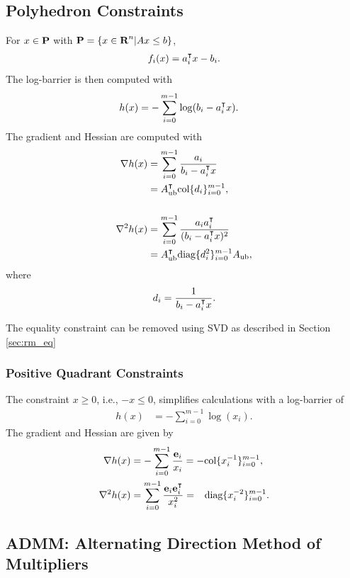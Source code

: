 \documentclass{article}
\begin{document}

\subsection{Polyhedron Constraints}
    For $x\in\textbf{P}$ with $\textbf{P}=\{x\in\textbf{R}^n|Ax\leq b\}$, 
    \begin{align*}
        f_i(x)=a_i^\intercal x-b_i.
    \end{align*}
    The log-barrier is then computed with
    \begin{align*}
        h(x)&=-\sum_{i=0}^{m-1} \log(b_i-a_i^\intercal x).
    \end{align*}
    The gradient and Hessian are computed with
    \begin{align*}
        \nabla h(x)&=\sum_{i=0}^{m-1} \frac{a_i}{b_i-a_i^\intercal x}
        \\&=A_{\text{ub}}^\intercal \text{col}\{d_i\}_{i=0}^{m-1},
        \\\\
        \nabla^2 h(x)&=\sum_{i=0}^{m-1} \frac{a_ia_i^\intercal}{(b_i-a_i^\intercal x)^2}
        \\&=A_{\text{ub}}^\intercal \text{diag}\{d_i^2\}_{i=0}^{m-1} A_{\text{ub}},
    \end{align*}
    where
    \begin{align*}
        d_i=\frac{1}{b_i-a_i^\intercal x}.
    \end{align*}

    The equality constraint can be removed using SVD as described in Section
    \ref{sec:rm_eq}

    \clearpage
\subsubsection{Positive Quadrant Constraints}
    The constraint $x\geq0$, i.e., $-x\leq0$, simplifies calculations with
    a log-barrier of 
    \begin{align*}
        h(x)&=-\sum_{i=0}^{m-1} \log(x_i).
    \end{align*}
    The gradient and Hessian are given by
    \begin{align*}
        \grad h(x)&=-\sum_{i=0}^{m-1} \frac{\e_i}{x_i}
        =-\col\{x_i^{-1}\}_{i=0}^{m-1},
        \\
        \grad^2 h(x)&=\sum_{i=0}^{m-1} \frac{\e_i\e_i^\tp}{x_i^2}
        =\minus\diag\{x_i^{-2}\}_{i=0}^{m-1}.
    \end{align*}

\subsection{ADMM: Alternating Direction Method of Multipliers}
\end{document}

